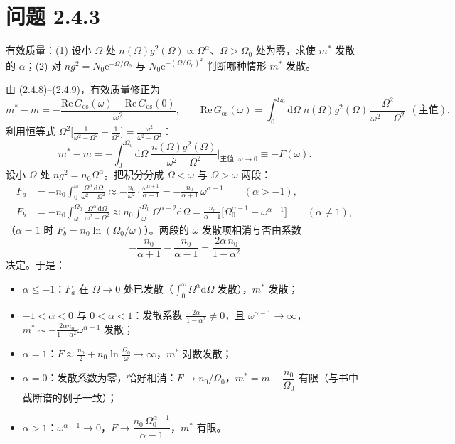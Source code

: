 \section*{问题 2.4.3}
\begin{problem}
有效质量：(1) 设小 $\Omega$ 处 $n(\Omega)g^2(\Omega)\propto\Omega^\alpha$、$\Omega>\Omega_0$ 处为零，求使 $m^*$ 发散的 $\alpha$；(2) 对 $n g^2=N_0\mathrm{e}^{-\Omega/\Omega_0}$ 与 $N_0\mathrm{e}^{-(\Omega/\Omega_0)^2}$ 判断哪种情形 $m^*$ 发散。
\end{problem}
\solution
由 (2.4.8)–(2.4.9)，有效质量修正为
\begin{equation*}
m^*-m=-\frac{\mathrm{Re}\,G_{\mathrm{os}}(\omega)-\mathrm{Re}\,G_{\mathrm{os}}(0)}{\omega^2},
\qquad
\mathrm{Re}\,G_{\mathrm{os}}(\omega)=\int_0^{\Omega_0}\mathrm{d}\Omega\;
n(\Omega)g^2(\Omega)\,\frac{\Omega^2}{\omega^2-\Omega^2}\ \ (\text{主值}).
\end{equation*}
利用恒等式 $\Omega^2\big[\frac{1}{\omega^2-\Omega^2}+\frac1{\Omega^2}\big]=\frac{\omega^2}{\omega^2-\Omega^2}$：
\begin{equation*}
m^*-m=-\int_0^{\Omega_0}\mathrm{d}\Omega\;\frac{n(\Omega)g^2(\Omega)}{\omega^2-\Omega^2}\Big|_{\text{主值},\ \omega\to0}
\equiv-F(\omega).
\end{equation*}
设小 $\Omega$ 处 $n g^2=n_0\Omega^{\alpha}$。把积分分成 $\Omega<\omega$ 与 $\Omega>\omega$ 两段：
\begin{align*}
F_a&=-n_0\int_0^{\omega}\frac{\Omega^{\alpha}\,\mathrm{d}\Omega}{\omega^2-\Omega^2}
\approx-\frac{n_0}{\omega^2}\cdot\frac{\omega^{\alpha+1}}{\alpha+1}
=-\frac{n_0}{\alpha+1}\,\omega^{\alpha-1}\qquad(\alpha>-1),\\
F_b&=-n_0\int_{\omega}^{\Omega_0}\frac{\Omega^{\alpha}\,\mathrm{d}\Omega}{\omega^2-\Omega^2}
\approx n_0\int_{\omega}^{\Omega_0}\Omega^{\alpha-2}\mathrm{d}\Omega
=\frac{n_0}{\alpha-1}\big[\Omega_0^{\alpha-1}-\omega^{\alpha-1}\big]\qquad(\alpha\neq1),
\end{align*}
（$\alpha=1$ 时 $F_b=n_0\ln(\Omega_0/\omega)$）。两段的 $\omega$ 发散项相消与否由系数
\begin{equation*}
-\frac{n_0}{\alpha+1}-\frac{n_0}{\alpha-1}=\frac{2\alpha\,n_0}{1-\alpha^2}
\end{equation*}
决定。于是：
\begin{itemize}
\item $\alpha\le-1$：$F_a$ 在 $\Omega\to0$ 处已发散（$\int_0^\omega\Omega^\alpha\mathrm{d}\Omega$ 发散），$m^*$ 发散；
\item $-1<\alpha<0$ 与 $0<\alpha<1$：发散系数 $\frac{2\alpha}{1-\alpha^2}\neq0$，且 $\omega^{\alpha-1}\to\infty$，$m^*\sim-\frac{2\alpha n_0}{1-\alpha^2}\omega^{\alpha-1}$ 发散；
\item $\alpha=1$：$F\approx\frac{n_0}{2}+n_0\ln\frac{\Omega_0}{\omega}\to\infty$，$m^*$ 对数发散；
\item $\alpha=0$：发散系数为零，恰好相消：$F\to n_0/\Omega_0$，$m^*=m-\dfrac{n_0}{\Omega_0}$ 有限（与书中截断谱的例子一致）；
\item $\alpha>1$：$\omega^{\alpha-1}\to0$，$F\to\dfrac{n_0\,\Omega_0^{\alpha-1}}{\alpha-1}$，$m^*$ 有限。
\end{itemize}

